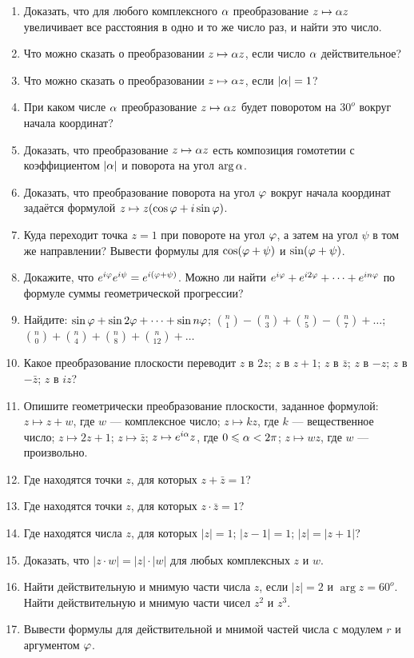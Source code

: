 \begin{enumerate}
\item Доказать, что для любого комплексного $\alpha$ преобразование
$z \mapsto \alpha z$ увеличивает все расстояния в одно и то же число раз, и
найти это число.
\item Что можно сказать о преобразовании $z \mapsto \alpha z$, если число $\alpha$ действительное?
\item Что можно сказать о преобразовании $z \mapsto \alpha z$, если $|\alpha| = 1$?
\item При каком числе $\alpha$ преобразование $z \mapsto \alpha z$ будет поворотом
на $30^o$ вокруг начала координат?
\item Доказать, что преобразование $z \mapsto \alpha z$ есть композиция гомотетии 
с коэффициентом $|\alpha|$ и поворота на угол $\arg \alpha$.
\item Доказать, что преобразование поворота на угол $\varphi$ вокруг начала
 координат задаётся формулой $z \mapsto  z(\cos \varphi + i \sin \varphi)$.
\item Куда переходит точка $z = 1$ при повороте на угол $\varphi$, а затем
на угол $\psi$ в том же направлении? Вывести формулы для $\cos(\varphi + \psi)$
и $\sin(\varphi + \psi)$.
\item  \ipunkt  Докажите, что $e^{i\varphi} e^{i\psi} = e^{i(\varphi+\psi)}$.
\ipunkt  Можно ли найти $e^{i\varphi} + e^{i2\varphi} + \dots + e^{in\varphi}$ по формуле суммы геометрической прогрессии?
\item  Найдите: \ipunkt  $\sin \varphi + \sin 2\varphi + \dots + \sin n\varphi$; \ipunkt  $\binom n 1 - \binom n 3 + \binom n 5 - \binom n 7 + \dots$; \ipunkt  $\binom n 0 + \binom n 4 + \binom n 8 + \binom n {12} + \dots$
\item Какое преобразование плоскости переводит \ipunkt $z$ в $2z$;
\ipunkt  $z$ в $z + 1$;
\ipunkt  $z$ в $\bar z$;
\ipunkt  $z$ в $-z$;
\ipunkt  $z$ в $-\bar z$;
\ipunkt  $z$ в $iz$?
\item Опишите геометрически преобразование плоскости, заданное формулой:
\ipunkt $z \mapsto z + w$, где $w$ --- комплексное число;
\ipunkt $z \mapsto kz$, где $k$ --- вещественное число;
\ipunkt $z \mapsto 2z + 1$;
\ipunkt $z \mapsto \bar z$;
\ipunkt $z \mapsto e^{i\alpha}z$, где $0 \leqslant \alpha < 2\pi$;
\ipunkt $z \mapsto wz$, где $w$ --- произвольно.

\item Где находятся точки $z$, для которых $z + \bar z= 1$?
\item Где находятся точки $z$, для которых $z \cdot \bar z = 1$?
\item Где находятся числа $z$, для которых
\ipunkt $|z| = 1$;
\ipunkt $|z - 1| = 1$;
\ipunkt $|z| = |z + 1|$?
\item Доказать, что $|z \cdot w| = |z| \cdot |w|$ для любых комплексных $z$ и $w$.
\item Найти действительную и мнимую части числа $z$, если $|z| = 2$ и $\arg z = 60^o$.
Найти действительную и мнимую части чисел $z^2$ и  $z^3$.
\item Вывести формулы для действительной и мнимой частей числа с модулем $r$ и аргументом $\varphi$.


\end{enumerate}
